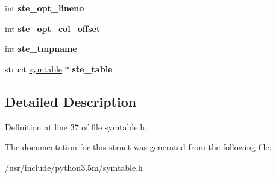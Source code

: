 \begin{DoxyCompactItemize}
\item 
int {\bfseries ste\+\_\+opt\+\_\+lineno}\hypertarget{struct__symtable__entry_a577586ad1073e9827effb2a1307ae6ad}{}\label{struct__symtable__entry_a577586ad1073e9827effb2a1307ae6ad}

\item 
int {\bfseries ste\+\_\+opt\+\_\+col\+\_\+offset}\hypertarget{struct__symtable__entry_ab37cab7a9c4bb2ec9e0d7716b22e84de}{}\label{struct__symtable__entry_ab37cab7a9c4bb2ec9e0d7716b22e84de}

\item 
int {\bfseries ste\+\_\+tmpname}\hypertarget{struct__symtable__entry_acf3f6e0c57b25f389ee61ef9b546462b}{}\label{struct__symtable__entry_acf3f6e0c57b25f389ee61ef9b546462b}

\item 
struct \hyperlink{structsymtable}{symtable} $\ast$ {\bfseries ste\+\_\+table}\hypertarget{struct__symtable__entry_a42ce617896ae1d9718d309d54dc0dd09}{}\label{struct__symtable__entry_a42ce617896ae1d9718d309d54dc0dd09}

\end{DoxyCompactItemize}


\subsection{Detailed Description}


Definition at line 37 of file symtable.\+h.



The documentation for this struct was generated from the following file\+:\begin{DoxyCompactItemize}
\item 
/usr/include/python3.\+5m/symtable.\+h\end{DoxyCompactItemize}
